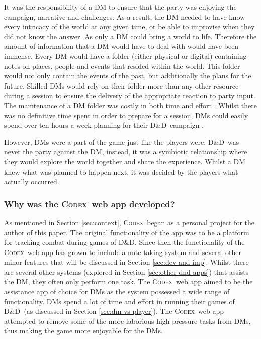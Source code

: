 \documentclass[final]{cmpreport}
\newcommand{\dnd}{D\&D}
\newcommand{\Codex}{\textsc{Codex}}
\begin{document}
			It was the responsibility of a DM to ensure that the party was enjoying the campaign, narrative and challenges. As a result, the DM needed to have know every intricacy of the world at any given time, or be able to improvise when they did not know the answer. As only a DM could bring a world to life. Therefore the amount of information that a DM would have to deal with would have been immense. Every DM would have a folder (either physical or digital) containing notes on places, people and events that resided within the world. This folder would not only contain the events of the past, but additionally the plans for the future. Skilled DMs would rely on their folder more than any other resource during a session to ensure the delivery of the appropriate reaction to party input. The maintenance of a DM folder was costly in both time and effort \citep{GMTips}. Whilst there was no definitive time spent in order to prepare for a session, DMs could easily spend over ten hours a week planning for their \dnd \ campaign \citep{DungeonMaster}. 
			
			However, DMs were a part of the game just like the players were. \dnd \ was never the party against the DM, instead, it was a symbiotic relationship where they would explore the world together and share the experience. Whilst a DM knew what was planned to happen next, it was decided by the players what actually occurred. 
				
			\subsubsection{Why was the \Codex \ web app developed?} \label{sec:why-codex}
			As mentioned in Section \ref{sec:context}, \Codex \ began as a personal project for the author of this paper. The original functionality of the app was to be a platform for tracking combat during games of \dnd. Since then the functionality of the \Codex \ web app has grown to include a note taking system and several other minor features that will be discussed in Section \ref{sec:dev-and-imp}. Whilst there are several other systems (explored in Section \ref{sec:other-dnd-apps}) that assists the DM, they often only perform one task. The \Codex \ web app aimed to be the assistance app of choice for DMs as the system possessed a wide range of functionality. DMs spend a lot of time and effort in running their games of \dnd \ (as discussed in Section \ref{sec:dm-vs-player}). The \Codex \ web app attempted to remove some of the more laborious high pressure tasks from DMs, thus making the game more enjoyable for the DMs.
\end{document}
